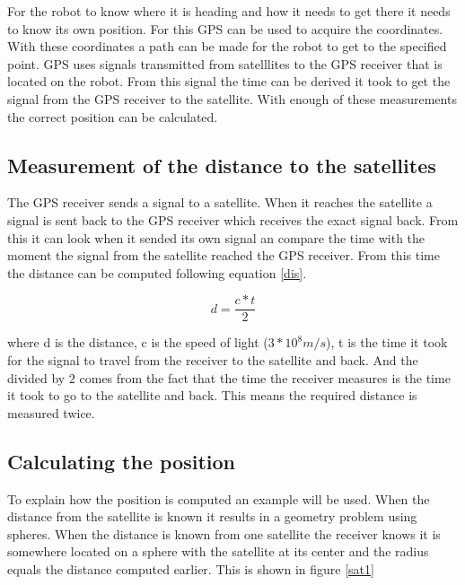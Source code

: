 \documentclass{article}
\begin{document}
For the robot to know where it is heading and how it needs to get there it needs to know its own position. For this GPS can be used to acquire the coordinates. With these coordinates a path can be made for the robot to get to the specified point. GPS uses signals transmitted from satelllites to the GPS receiver that is located on the robot. From this signal the time can be derived it took to get the signal from the GPS receiver to the satellite. With enough of these measurements the correct position can be calculated.

\subsection{Measurement of the distance to the satellites}

The GPS receiver sends a signal to a satellite. When it reaches the satellite a signal is sent back to the GPS receiver which receives the exact signal back. From this it can look when it sended its own signal an compare the time with the moment the signal from the satellite reached the GPS receiver. From this time the distance can be computed following equation \ref{dis}.

\begin{equation}
d = \frac{c*t}{2}
\label{dis}
\end{equation}

where d is the distance, c is the speed of light ($3*10^8 m/s$), t is the time it took for the signal to travel from the receiver to the satellite and back. And the divided by $2$ comes from the fact that the time the receiver measures is the time it took to go to the satellite and back. This means the required distance is measured twice.

\subsection{Calculating the position}

To explain how the position is computed an example will be used. When the distance from the satellite is known it results in a geometry problem using spheres. When the distance is known from one satellite the receiver knows it is somewhere located on a sphere with the satellite at its center and the radius equals the distance computed earlier. This is shown in figure \ref{sat1}
\end{document}
